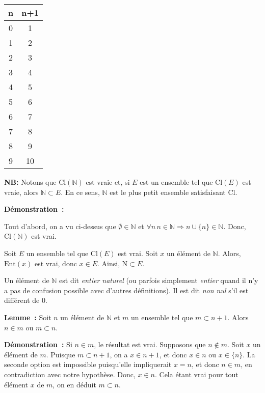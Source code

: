 \begin{center}
\begin{tabular}{c | c}
    n & n+1 \\
    \hline 
    0 & 1 \\
    1 & 2 \\
    2 & 3 \\
    3 & 4 \\
    4 & 5 \\
    5 & 6 \\
    6 & 7 \\
    7 & 8 \\
    8 & 9 \\
    9 & 10 \\
\end{tabular}
\end{center}

\noindent\textbf{NB:} Notons que $\mathrm{Cl}(\mathbb{N})$ est vraie et, si $E$ est un ensemble tel que $\mathrm{Cl}(E)$ est vraie, alors $\mathbb{N} \subset E$. 
En ce sens, $\mathbb{N}$ est le plus petit ensemble satisfaisant $\mathrm{Cl}$.

\medskip

\noindent\textbf{Démonstration :}

Tout d'abord, on a vu ci-dessus que $\emptyset \in \mathbb{N}$ et $\forall n \, n \in \mathbb{N} \Rightarrow n \cup \lbrace n \rbrace \in \mathbb{N}$. 
Donc, $\mathrm{Cl}(\mathbb{N})$ est vrai. 

Soit $E$ un ensemble tel que $\mathrm{Cl}(E)$ est vrai. 
Soit $x$ un élément de $\mathbb{N}$. 
Alors, $\mathrm{Ent}(x)$ est vrai, donc $x \in E$. 
Ainsi, $\mathrm{N} \subset E$. 

\done

\medskip

Un élément de $\mathbb{N}$ est dit \textit{entier naturel} (ou parfois simplement \textit{entier} quand il n'y a pas de confusion possible avec d'autres définitions). 
Il est dit \textit{non nul} s'il est différent de $0$.

\medskip

\noindent\textbf{Lemme :} Soit $n$ un élément de $\mathbb{N}$ et $m$ un ensemble tel que $m \subset n+1$. 
    Alors $n \in m$ ou $m \subset n$.

\medskip

\noindent\textbf{Démonstration :}
    Si $n \in m$, le résultat est vrai. 
    Supposons que $n \notin m$. 
    Soit $x$ un élément de $m$. 
    Puisque $m \subset n+1$, on a $x \in n+1$, et donc $x \in n$ ou $x \in \lbrace n \rbrace$. 
    La seconde option est impossible puisqu'elle impliquerait $x = n$, et donc $n \in m$, en contradiction avec notre hypothèse. 
    Donc, $x \in n$. 
    Cela étant vrai pour tout élément $x$ de $m$, on en déduit $m \subset n$.

